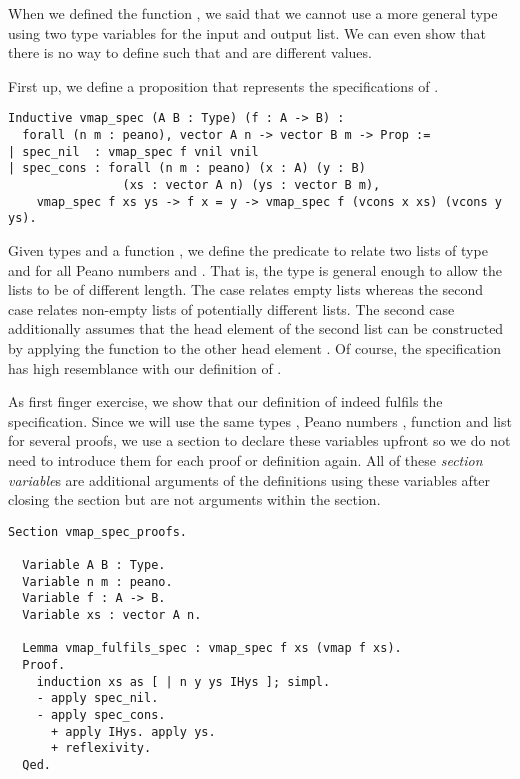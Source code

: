 When we defined the function , we said that we cannot use a more general type using two type variables  for the input and output list.
We can even show that there is no way to define  such that  and  are different values.

First up, we define a proposition  that represents the specifications of .

\begin{verbatim}
Inductive vmap_spec (A B : Type) (f : A -> B) :
  forall (n m : peano), vector A n -> vector B m -> Prop :=
| spec_nil  : vmap_spec f vnil vnil
| spec_cons : forall (n m : peano) (x : A) (y : B)
                (xs : vector A n) (ys : vector B m),
    vmap_spec f xs ys -> f x = y -> vmap_spec f (vcons x xs) (vcons y ys).
\end{verbatim}

Given types  and a function , we define the predicate to relate two lists of type  and  for all Peano numbers  and .
That is, the type is general enough to allow the lists to be of different length.
The  case relates empty lists whereas the second case  relates non-empty lists of potentially different lists.
The second case additionally assumes that the head element of the second list  can be constructed by applying the function to the other head element .
Of course, the specification has high resemblance with our definition of .

As first finger exercise, we show that our definition of  indeed fulfils the specification.
Since we will use the same types , Peano numbers , function  and list  for several proofs, we use a section to declare these variables upfront so we do not need to introduce them for each proof or definition again.
All of these \emph{section variable}s are additional arguments of the definitions using these variables after closing the section but are not arguments within the section.

\begin{verbatim}
Section vmap_spec_proofs.

  Variable A B : Type.
  Variable n m : peano.
  Variable f : A -> B.
  Variable xs : vector A n.

  Lemma vmap_fulfils_spec : vmap_spec f xs (vmap f xs).
  Proof.
    induction xs as [ | n y ys IHys ]; simpl.
    - apply spec_nil.
    - apply spec_cons.
      + apply IHys. apply ys.
      + reflexivity.
  Qed.
\end{verbatim}

